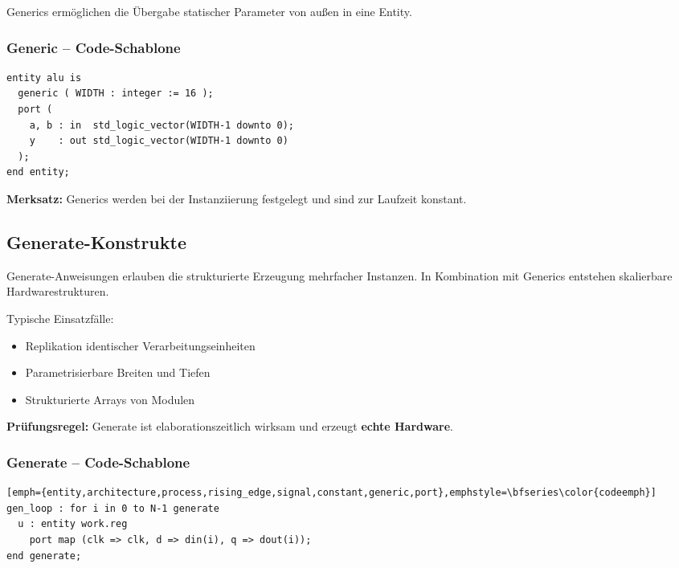 \documentclass[10pt,a4paper]{article}
\newcommand{\hilite}[1]{\colorbox{yellow!25}{#1}}
\newcommand{\imp}[1]{\textbf{\textcolor{codeemph}{#1}}}
\begin{document}
\begin{multicols}{3}
Generics ermöglichen die Übergabe statischer Parameter von außen in eine Entity.

\subsubsection*{Generic – Code-Schablone}
\begin{lstlisting}[emph={entity,architecture,process,rising_edge,signal,constant,generic,port},emphstyle=\bfseries\color{codeemph}]
entity alu is
  generic ( WIDTH : integer := 16 );
  port (
    a, b : in  std_logic_vector(WIDTH-1 downto 0);
    y    : out std_logic_vector(WIDTH-1 downto 0)
  );
end entity;
\end{lstlisting}

\textbf{Merksatz:}  
\hilite{Generics} werden bei der \hilite{Instanziierung} \hilite{festgelegt} und sind zur Laufzeit konstant.

\subsection{Generate-Konstrukte}
Generate-Anweisungen erlauben die strukturierte Erzeugung mehrfacher Instanzen. In Kombination mit Generics entstehen skalierbare Hardwarestrukturen.

Typische Einsatzfälle:
\begin{itemize}
  \item Replikation identischer Verarbeitungseinheiten
  \item Parametrisierbare Breiten und Tiefen
  \item Strukturierte Arrays von Modulen
\end{itemize}

\imp{Prüfungsregel:}  
\hilite{Generate} ist \hilite{elaborationszeitlich} \hilite{wirksam} und erzeugt \textbf{echte Hardware}.

\subsubsection*{Generate – Code-Schablone}
\begin{lstlisting}[emph={entity,architecture,process,rising_edge,signal,constant,generic,port},emphstyle=\bfseries\color{codeemph}][emph={entity,architecture,process,rising_edge,signal,constant,generic,port},emphstyle=\bfseries\color{codeemph}]
gen_loop : for i in 0 to N-1 generate
  u : entity work.reg
    port map (clk => clk, d => din(i), q => dout(i));
end generate;
\end{lstlisting}


\end{multicols}
\end{document}
